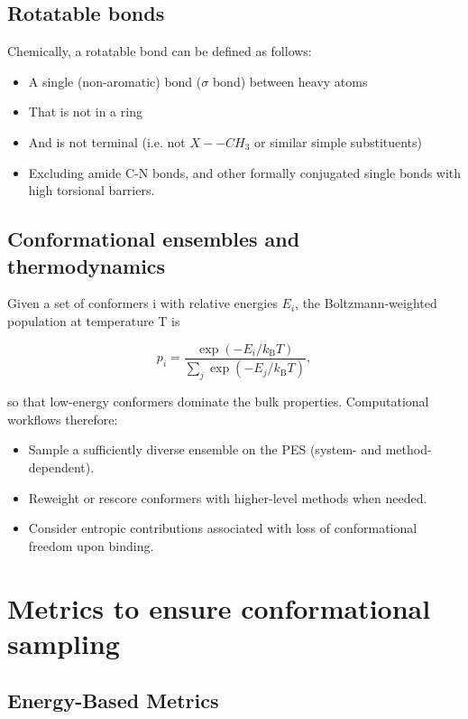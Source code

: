 \documentclass[12pt]{article}
\begin{document}
\subsection{Rotatable bonds}
Chemically, a rotatable bond can be defined as follows: 

\begin{itemize}
  \item A single (non-aromatic) bond ($\sigma$ bond) between heavy atoms
  \item That is not in a ring
  \item And is not terminal (i.e. not $X--CH_3$ or similar simple substituents)
  \item Excluding amide C-N bonds, and other formally conjugated single bonds with high torsional barriers.
\end{itemize}


\subsection{Conformational ensembles and thermodynamics}

Given a set of conformers i with relative energies $E_i$, the Boltzmann-weighted population at temperature T is

\begin{equation}
p_i = \frac{\exp(-E_i/k_\mathrm{B}T)}{\displaystyle\sum_j \exp(-E_j/k_\mathrm{B}T)},
\end{equation}

so that low-energy conformers dominate the bulk properties. Computational workflows therefore:

\begin{itemize}
  \item Sample a sufficiently diverse ensemble on the PES (system- and method-dependent).
  \item Reweight or rescore conformers with higher-level methods when needed.
  \item Consider entropic contributions associated with loss of conformational freedom upon binding.
\end{itemize}

\section{Metrics to ensure conformational sampling}

\subsection{Energy-Based Metrics}
\end{document}
